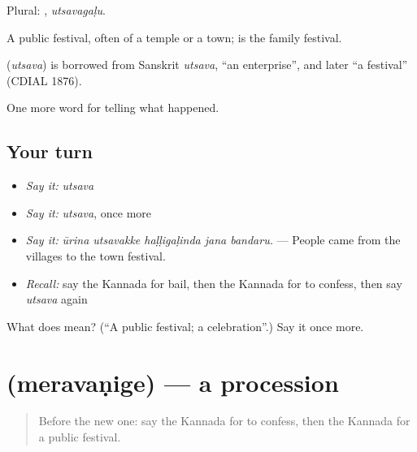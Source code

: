 Plural: , \emph{utsavagaḷu}.

A public festival, often of a temple or a town;  is the family festival.

\begin{cousinweb}
\textbf{} (\emph{utsava}) is borrowed from Sanskrit \emph{utsava}, \textquotedblleft{}an enterprise\textquotedblright{}, and later \textquotedblleft{}a festival\textquotedblright{} (CDIAL 1876).
\end{cousinweb}

\begin{grammarlens}[title={What you've built}]
One more word for telling what happened.
\end{grammarlens}

\subsection*{Your turn}
\begin{itemize}
\raggedright
  \item \emph{Say it:} \emph{utsava}
  \item \emph{Say it:} \emph{utsava}, once more
  \item \emph{Say it:} \emph{ūrina utsavakke haḷḷigaḷinda jana bandaru.} — People came from the villages to the town festival.
  \item \emph{Recall:} say the Kannada for bail, then the Kannada for to confess, then say \emph{utsava} again
\end{itemize}

\begin{tcolorbox}[breakable,colback=teal!4,colframe=teal!35!black,title={Before you move on}]
What does  mean? (\textquotedblleft{}A public festival; a celebration\textquotedblright{}.) Say it once more.
\end{tcolorbox}
\section[\texorpdfstring{\kn{ಮೆರವಣಿಗೆ} (meravaṇige)}{ಮೆರವಣಿಗೆ (meravaṇige)}]{ (meravaṇige) — a procession}

\label{lesson:KA-C359-meravanige}



\begin{quote}
Before the new one: say the Kannada for to confess, then the Kannada for a public festival.
\end{quote}

